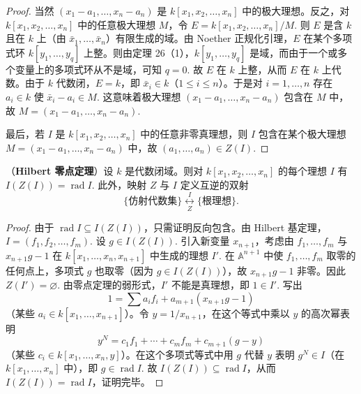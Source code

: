 \begin{proof}
当然 \((x_1-a_1, \ldots, x_n-a_n)\) 是 \(k[x_1, x_2, \ldots, x_n]\) 中的极大理想。反之，对 \(k[x_1, x_2, \ldots, x_n]\) 中的任意极大理想 \(M\)，令 \(E = k[x_1, x_2, \ldots, x_n]/M\). 则 \(E\) 是含 \(k\) 且在 \(k\) 上（由 \(\bar x_1, \ldots, \bar x_n\)）有限生成的域。由 Noether 正规化引理，\(E\) 在某个多项式环 \(k[y_1, \ldots, y_q]\) 上整。则由定理 26（1），\(k[y_1, \ldots, y_q]\) 是域，而由于一个或多个变量上的多项式环从不是域，可知 \(q = 0\). 故 \(E\) 在 \(k\) 上整，从而 \(E\) 在 \(k\) 上代数。由于 \(k\) 代数闭，\(E = k\)，即 \(\bar x_i \in k\)（\(1 \leq i \leq n\)）。于是对 \(i = 1, \ldots, n\) 存在 \(a_i \in k\) 使 \(\bar x_i-a_i \in M\). 这意味着极大理想 \((x_1-a_1, \ldots, x_n-a_n)\) 包含在 \(M\) 中，故 \(M = (x_1-a_1, \ldots, x_n-a_n)\).

最后，若 \(I\) 是 \(k[x_1, x_2, \ldots, x_n]\) 中的任意非零真理想，则 \(I\) 包含在某个极大理想 \(M = (x_1-a_1, \ldots, x_n-a_n)\) 中，故 \((a_1, \ldots, a_n) \in Z(I)\).
\end{proof}

\begin{theorem}\label{thm:15.32}
（\textbf{Hilbert 零点定理}）设 \(k\) 是代数闭域。则对 \(k[x_1, x_2, \ldots, x_n]\) 的每个理想 \(I\) 有 \(I(Z(I)) = \operatorname{rad}I\). 此外，映射 \(Z\) 与 \(I\) 定义互逆的双射
\[
\{\text{仿射代数集}\} \underset{Z}{\overset{I}{\longleftrightarrow}} \{\text{根理想}\}.
\]
\end{theorem}

\begin{proof}
由于 \(\operatorname{rad}I \subseteq I(Z(I))\)，只需证明反向包含。由 Hilbert 基定理，\(I = (f_1, f_2, \ldots, f_m)\). 设 \(g \in I(Z(I))\). 引入新变量 \(x_{n+1}\)，考虑由 \(f_1, \ldots, f_m\) 与 \(x_{n+1}g-1\) 在 \(k[x_1, \ldots, x_n, x_{n+1}]\) 中生成的理想 \(I'\). 在 \(\mathbb{A}^{n+1}\) 中使 \(f_1, \ldots, f_m\) 取零的任何点上，多项式 \(g\) 也取零（因为 \(g \in I(Z(I))\)），故 \(x_{n+1}g-1\) 非零。因此 \(Z(I') = \varnothing\). 由零点定理的弱形式，\(I'\) 不能是真理想，即 \(1 \in I'\). 写出
\[
1 = \sum a_if_i+a_{m+1}(x_{n+1}g-1)
\]
（某些 \(a_i \in k[x_1, \ldots, x_{n+1}]\)）。令 \(y = 1/x_{n+1}\)，在这个等式中乘以 \(y\) 的高次幂表明
\[
y^N = c_1f_1+\cdots+c_mf_m+c_{m+1}(g-y)
\]
（某些 \(c_i \in k[x_1, \ldots, x_n, y]\)）。在这个多项式等式中用 \(g\) 代替 \(y\) 表明 \(g^N \in I\)（在 \(k[x_1, \ldots, x_n]\) 中），即 \(g \in \operatorname{rad}I\). 故 \(I(Z(I)) \subseteq \operatorname{rad}I\)，从而 \(I(Z(I)) = \operatorname{rad}I\)，证明完毕。
\end{proof}

